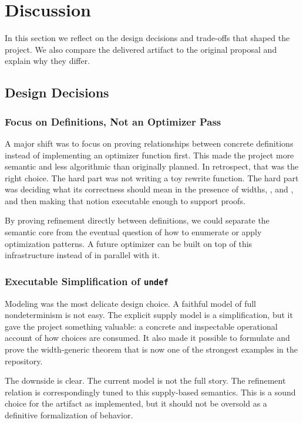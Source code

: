 \section{Discussion}
\label{sec:discussion}

In this section we reflect on the design decisions and trade-offs that
shaped the project.
We also compare the delivered artifact to the original proposal and
explain why they differ.

\subsection{Design Decisions}

\subsubsection{Focus on Definitions, Not an Optimizer Pass}

A major shift was to focus on proving relationships between concrete
definitions instead of implementing an optimizer function first. This made the
project more semantic and less algorithmic than originally planned. In
retrospect, that was the right choice. The hard part was not writing a toy
rewrite function. The hard part was deciding what its correctness should mean
in the presence of widths, \poison, and \vundef, and then making that notion
executable enough to support proofs.

By proving refinement directly between definitions, we could separate the
semantic core from the eventual question of how to enumerate or apply
optimization patterns. A future optimizer can be built on top of this
infrastructure instead of in parallel with it.

\subsubsection{Executable Simplification of \texttt{undef}}

Modeling \vundef was the most delicate design choice. A faithful model of full
\llvm nondeterminism is not easy.
The explicit supply model is a simplification, but it gave the project something
valuable: a concrete and inspectable operational account of how \vundef
choices are consumed. It also made it possible to formulate and prove the
width-generic \vundef theorem that is now one of the strongest examples in the
repository.

The downside is clear. The current model is not the full \llvm story. The
refinement relation is correspondingly tuned to this supply-based semantics.
This is a sound choice for the artifact as implemented, but it should not be
oversold as a definitive formalization of \llvm \vundef behavior.

